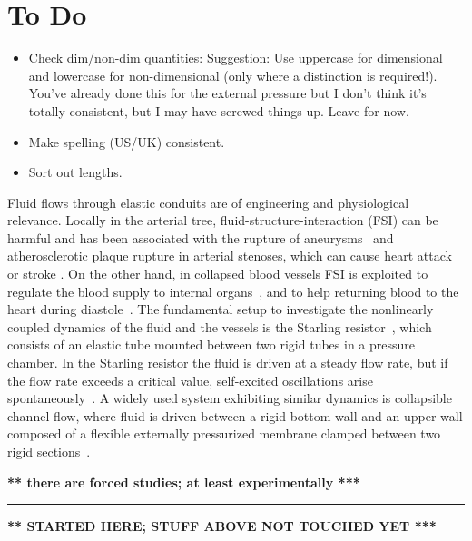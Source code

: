 \documentclass[aps,prl,reprint,superscriptaddress,floatfix]{revtex4-1}
\begin{document}
\maketitle

\section*{To Do}
\begin{itemize}
\item Check dim/non-dim quantities: Suggestion: Use uppercase for
  dimensional and lowercase for non-dimensional (only where a distinction
  is required!). You've already done
  this for the external pressure but I don't think it's totally
  consistent, but I may have screwed things up. Leave for now.
\item Make spelling (US/UK) consistent.
  \item Sort out lengths.
\end{itemize}

Fluid flows through elastic conduits are of engineering and
physiological relevance. Locally in the arterial tree,
fluid-structure-interaction (FSI) can be harmful and has been
associated with the rupture of aneurysms~\cite{Han13} and
atherosclerotic plaque rupture in arterial stenoses, which can cause
heart attack or stroke \cite{Ku97}. On the other hand, in collapsed
blood vessels FSI is exploited to regulate the blood supply to
internal organs~\cite{Shapiro77}, and to help returning blood to the
heart during diastole~\cite{Casey08}. The fundamental setup to
investigate the nonlinearly coupled dynamics of the fluid and the
vessels is the Starling resistor~\cite{Knowlton12}, which consists of
an elastic tube mounted between two rigid tubes in a pressure
chamber. In the Starling resistor the fluid is driven at a steady flow
rate, but if the flow rate exceeds a critical value, self-excited
oscillations arise spontaneously~\cite{Bertram08,Heil10,Stewart09}. A
widely used system exhibiting similar dynamics is collapsible channel
flow, where fluid is driven between a rigid bottom wall and an upper
wall composed of a flexible externally pressurized membrane clamped
between two rigid  sections~\cite{Jensen03,Heil11}.

{\bf *** there are forced studies; at least experimentally ***}

\hrule

{\bf *** STARTED HERE; STUFF ABOVE NOT TOUCHED YET ***}
\end{document}
